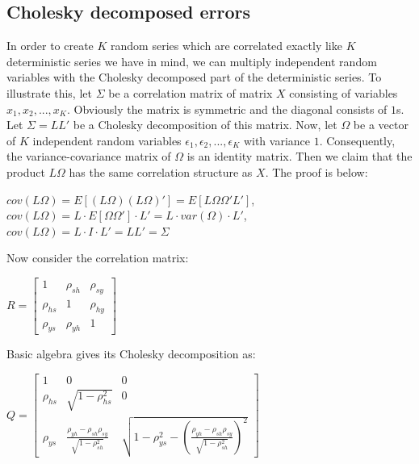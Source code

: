 \documentclass[]{article}
\begin{document}
\begin{appendix}
\section{Cholesky decomposed errors}
\label{appa}

In order to create $K$ random series which are correlated exactly like $K$ deterministic series we have in mind, we can multiply independent random variables with the Cholesky decomposed part of the deterministic series. To illustrate this, let $\Sigma$ be a correlation matrix of matrix $X$ consisting of variables $x_1, x_2, ..., x_K$. Obviously the matrix is symmetric and the diagonal consists of $1$s. Let $\Sigma = LL'$ be a Cholesky decomposition of this matrix. Now, let $\Omega$ be a vector of $K$ independent random variables $\epsilon_1, \epsilon_2, ..., \epsilon_K$ with variance $1$. Consequently, the variance-covariance matrix of $\Omega$ is an identity matrix. Then we claim that the product $L\Omega$ has the same correlation structure as $X$. The proof is below:

\begin{center}
  $cov(L\Omega) = E[(L\Omega)(L\Omega)'] = E[L\Omega\Omega'L']$,\\
  $cov(L\Omega) = L \cdot E[\Omega\Omega'] \cdot L' = L \cdot var(\Omega) \cdot L'$,\\
  $cov(L\Omega) = L\cdot I \cdot L' = LL' = \Sigma$
\end{center}

Now consider the correlation matrix:

\begin{center}
	$R = \begin{bmatrix}
					1 & \rho_{sh} & \rho_{sy} \\
					\rho_{hs} & 1 & \rho_{hy} \\
					\rho_{ys} & \rho_{yh} & 1
			\end{bmatrix}
	$
\end{center}

Basic algebra gives its Cholesky decomposition as:

\begin{center}
	$Q = \begin{bmatrix}
					1 & 0 & 0 \\
					\rho_{hs} & \sqrt{1-\rho^2_{hs}} & 0 \\
					\rho_{ys} & \frac{\rho_{yh} - \rho_{sh}\rho_{sy}}{\sqrt{1-\rho^2_{sh}}} & \sqrt{1-\rho^2_{ys}-(\frac{\rho_{yh} - \rho_{sh}\rho_{sy}}{\sqrt{1-\rho^2_{sh}}})^2}
			\end{bmatrix}
	$
\end{center}



\end{appendix}
\end{document}
